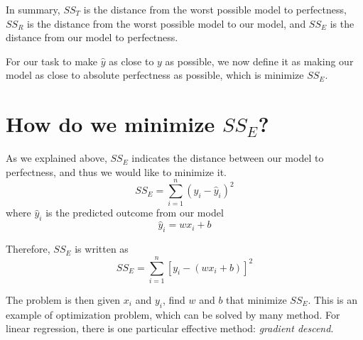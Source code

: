 \documentclass[
	letterpaper
]{article}
\begin{document}
In summary, $SS_T$ is the distance from the worst possible model to perfectness, $SS_R$ is the distance from the worst possible model to our model, and $SS_E$ is the distance from our model to perfectness.

For our task to make $\hat y$ as close to $y$ as possible, we now define it as making our model as close to absolute perfectness as possible, which is minimize $SS_E$.


\section{How do we minimize $SS_E$?}
As we explained above, $SS_E$ indicates the distance between our model to perfectness, and thus we would like to minimize it.
\begin{equation}
SS_E = \sum_{i = 1}^n (y_i - \hat y_i) ^2
\end{equation}
where $\hat y_i$ is the predicted outcome from our model
\begin{equation}
\hat y_i = w x_i + b
\end{equation}

Therefore, $SS_E$ is written as
\begin{equation}
SS_E = \sum_{i = 1}^n [y_i - (w x_i + b)] ^2
\end{equation}

The problem is then given $x_i$ and $y_i$, find $w$ and $b$ that minimize $SS_E$.
This is an example of optimization problem, which can be solved by many method.
For linear regression, there is one particular effective method: \textit{gradient descend}.
\end{document}
